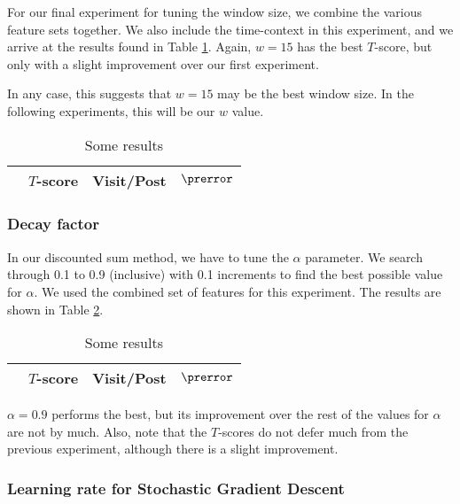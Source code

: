 For our final experiment for tuning the window size, we combine the various 
feature sets together. We also include the time-context in this experiment, and 
we arrive at the results found in Table \ref{tbl:par_tune_comb}. Again, $w=15$ 
has the best $T$-score, but only with a slight improvement over our first 
experiment.

In any case, this suggests that $w=15$ may be the best window size. In the 
following experiments, this will be our $w$ value.

\begin{table}
\begin{center}
\begin{tabular}{| l | c | c | c |}
\hline
& $T$-score			   &	Visit/Post & 	$\prerror$\\
\hline

\hline
\end{tabular}
\end{center}
\caption{Some results}\label{tbl:par_tune_comb}
\end{table}


\subsubsection{Decay factor}
In our discounted sum method, we have to tune the $\alpha$ parameter. We search 
through 0.1 to 0.9 (inclusive) with 0.1 increments to find the best possible 
value for $\alpha$.  We used the combined set of features for this experiment.
The results are shown in Table \ref{tbl:par_tune_decay}.
\begin{table}
\begin{center}
\begin{tabular}{| l | c | c | c |}
\hline
& $T$-score			   &	Visit/Post & 	$\prerror$\\
\hline
	
\hline
\end{tabular}
\end{center}
\caption{Some results}\label{tbl:par_tune_decay}
\end{table}

$\alpha=0.9$ performs the best, but its improvement over the rest of the values 
for $\alpha$ are not by much. Also, note that the $T$-scores do not defer much 
from the previous experiment, although there is a slight improvement.

\subsubsection{Learning rate for Stochastic Gradient Descent}

